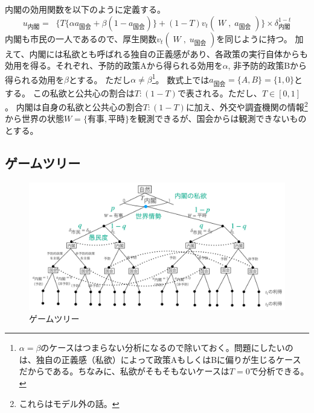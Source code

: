 \documentclass[main.tex]{subfiles}
\begin{document}
内閣の効用関数を以下のように定義する。
$$ u_\text{内閣} =\;\; \lbrace T\lbrace \alpha a_\text{国会} + \beta (1-a_\text{国会}) \rbrace  + (1-T)v_t(\;W\;,\; a_\text{国会}\;) \rbrace × \delta^{1-t}_{内閣}$$
内閣も市民の一人であるので、厚生関数$v_t(\;W\;,\; u_\text{国会}\;)$を同じように持つ。
加えて、内閣には私欲とも呼ばれる独自の正義感があり、各政策の実行自体からも効用を得る。それぞれ、予防的政策Aから得られる効用を$\alpha$, 非予防的政策Bから得られる効用を$\beta$とする。
ただし$\alpha ≠ \beta$\footnote{$\alpha=\beta$のケースはつまらない分析になるので除いておく。問題にしたいのは、独自の正義感（私欲）によって政策AもしくはBに偏りが生じるケースだからである。ちなみに、私欲がそもそもないケースは$T=0$で分析できる。}。
数式上では$a_{国会}=\lbrace A, B\rbrace = \lbrace 1,0\rbrace$とする。
この私欲と公共心の割合は$T:(1-T)$で表される。ただし、$T\in[0,1]$ 。
内閣は自身の私欲と公共心の割合$T:(1-T)$に加え、外交や調査機関の情報\footnote{これらはモデル外の話。}から世界の状態$W=\lbrace 有事, 平時\rbrace$を観測できるが、国会からは観測できないものとする。









\subsection{ゲームツリー}

\begin{figure}[htbp]
  \centering
  \includegraphics[width=1\textwidth]{./image/game_tree.png}
  \caption{ゲームツリー} 
  \label{fig:game_tree}
\end{figure}
\end{document}
